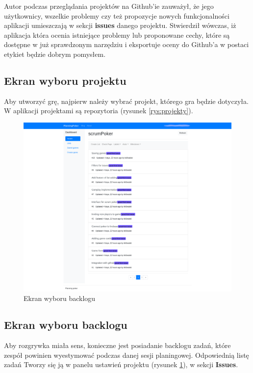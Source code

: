 Autor podczas przeglądania projektów na Github'ie zauważył, że jego użytkownicy,
wszelkie problemy czy też propozycje nowych funkcjonalności aplikacji umieszczają
w sekcji \textbf{issues} danego projektu. Stwierdził wówczas, iż aplikacja która ocenia
istniejące problemy lub proponowane cechy, które są dostępne w już sprawdzonym narzędziu
i eksportuje oceny do Github'a w postaci etykiet będzie dobrym pomysłem.


\subsection{Ekran wyboru projektu}

Aby utworzyć grę, najpierw należy wybrać projekt, którego gra będzie dotyczyła.
W aplikacji projektami są repozytoria (rysunek \ref{rys:projekty}).

\begin{figure}[H]
	\centering\includegraphics[width=\textwidth]{img/Issues}
	\caption{Ekran wyboru backlogu}\label{rys:issues}%
\end{figure}


\subsection{Ekran wyboru backlogu}

Aby rozgrywka miała sens, konieczne jest posiadanie backlogu zadań,
które zespół powinien wyestymować podczas danej sesji planingowej.
Odpowiednią listę zadań Tworzy się ją w panelu ustawień projektu (rysunek \ref{rys:issues}),
w sekcji \textbf{Issues}.

